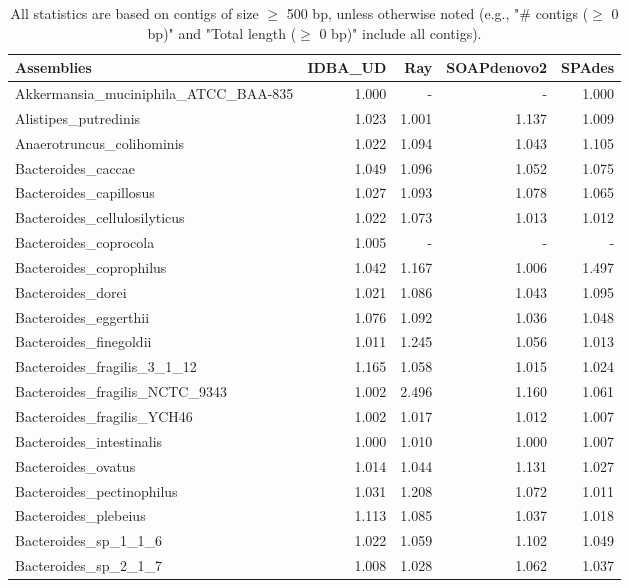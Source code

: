 \documentclass[12pt,a4paper]{article}
\begin{document}
\begin{table}[ht]
\begin{center}
\caption{All statistics are based on contigs of size $\geq$ 500 bp, unless otherwise noted (e.g., "\# contigs ($\geq$ 0 bp)" and "Total length ($\geq$ 0 bp)" include all contigs).}
\begin{tabular}{|l*{4}{|r}|}
\hline
Assemblies & IDBA\_UD & Ray & SOAPdenovo2 & SPAdes \\ \hline
Akkermansia\_muciniphila\_ATCC\_BAA-835 & 1.000 & - & - & 1.000 \\ \hline
Alistipes\_putredinis & 1.023 & 1.001 & 1.137 & 1.009 \\ \hline
Anaerotruncus\_colihominis & 1.022 & 1.094 & 1.043 & 1.105 \\ \hline
Bacteroides\_caccae & 1.049 & 1.096 & 1.052 & 1.075 \\ \hline
Bacteroides\_capillosus & 1.027 & 1.093 & 1.078 & 1.065 \\ \hline
Bacteroides\_cellulosilyticus & 1.022 & 1.073 & 1.013 & 1.012 \\ \hline
Bacteroides\_coprocola & 1.005 & - & - & - \\ \hline
Bacteroides\_coprophilus & 1.042 & 1.167 & 1.006 & 1.497 \\ \hline
Bacteroides\_dorei & 1.021 & 1.086 & 1.043 & 1.095 \\ \hline
Bacteroides\_eggerthii & 1.076 & 1.092 & 1.036 & 1.048 \\ \hline
Bacteroides\_finegoldii & 1.011 & 1.245 & 1.056 & 1.013 \\ \hline
Bacteroides\_fragilis\_3\_1\_12 & 1.165 & 1.058 & 1.015 & 1.024 \\ \hline
Bacteroides\_fragilis\_NCTC\_9343 & 1.002 & 2.496 & 1.160 & 1.061 \\ \hline
Bacteroides\_fragilis\_YCH46 & 1.002 & 1.017 & 1.012 & 1.007 \\ \hline
Bacteroides\_intestinalis & 1.000 & 1.010 & 1.000 & 1.007 \\ \hline
Bacteroides\_ovatus & 1.014 & 1.044 & 1.131 & 1.027 \\ \hline
Bacteroides\_pectinophilus & 1.031 & 1.208 & 1.072 & 1.011 \\ \hline
Bacteroides\_plebeius & 1.113 & 1.085 & 1.037 & 1.018 \\ \hline
Bacteroides\_sp\_1\_1\_6 & 1.022 & 1.059 & 1.102 & 1.049 \\ \hline
Bacteroides\_sp\_2\_1\_7 & 1.008 & 1.028 & 1.062 & 1.037 \\ \hline

\end{tabular}
\end{center}
\end{table}
\end{document}
